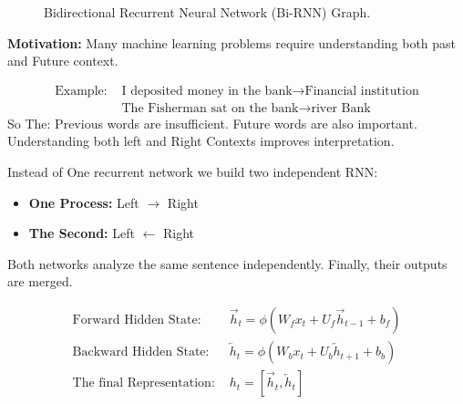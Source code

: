 \begin{figure}[htbp]
\caption{Bidirectional Recurrent Neural Network (Bi-RNN) Graph.}
\label{fig:birnn_p83}
\end{figure}

\textbf{Motivation:}
Many machine learning problems require understanding both past and Future context.

\begin{advbox}
\begin{align*}
\text{Example: } & \text{I deposited money in the bank} \to \text{Financial institution} \\
& \text{The Fisherman sat on the bank} \to \text{river Bank}
\end{align*}
So The: Previous words are insufficient. Future words are also important.
Understanding both left and Right Contexts improves interpretation.
\end{advbox}

Instead of One recurrent network we build two independent RNN:
\begin{itemize}
    \item \textbf{One Process:} Left $\to$ Right
    \item \textbf{The Second:} Left $\gets$ Right
\end{itemize}
Both networks analyze the same sentence independently. Finally, their outputs are merged.

\begin{align}
\text{Forward Hidden State: } & \overrightarrow{h}_t = \phi(W_f x_t + U_f \overrightarrow{h}_{t-1} + b_f) \\
\text{Backward Hidden State: } & \overleftarrow{h}_t = \phi(W_b x_t + U_b \overleftarrow{h}_{t+1} + b_b) \\
\text{The final Representation: } & h_t = [\overrightarrow{h}_t, \overleftarrow{h}_t]
\end{align}

